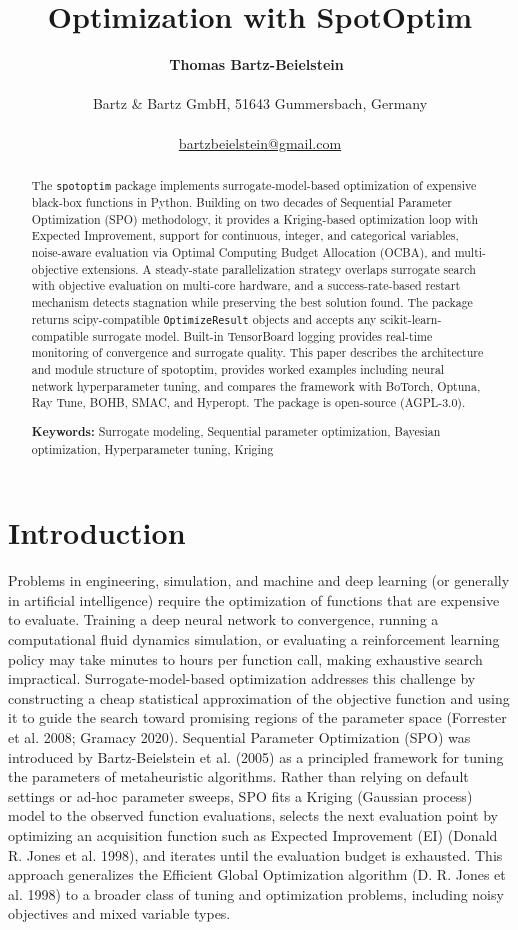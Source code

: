 \documentclass[
  twocolumn]{article}
\title{Optimization with SpotOptim}
\author{\textbf{Thomas
Bartz-Beielstein}~\orcidlink{0000-0002-5938-5158}\\\\Bartz \& Bartz
GmbH, 51643 Gummersbach,
Germany\\\\\href{mailto:bartzbeielstein@gmail.com}{bartzbeielstein@gmail.com}}
\date{}
\begin{document}
\maketitle
\begin{abstract}
The \texttt{spotoptim} package implements surrogate-model-based
optimization of expensive black-box functions in Python. Building on two
decades of Sequential Parameter Optimization (SPO) methodology, it
provides a Kriging-based optimization loop with Expected Improvement,
support for continuous, integer, and categorical variables, noise-aware
evaluation via Optimal Computing Budget Allocation (OCBA), and
multi-objective extensions. A steady-state parallelization strategy
overlaps surrogate search with objective evaluation on multi-core
hardware, and a success-rate-based restart mechanism detects stagnation
while preserving the best solution found. The package returns
scipy-compatible \texttt{OptimizeResult} objects and accepts any
scikit-learn-compatible surrogate model. Built-in TensorBoard logging
provides real-time monitoring of convergence and surrogate quality. This
paper describes the architecture and module structure of spotoptim,
provides worked examples including neural network hyperparameter tuning,
and compares the framework with BoTorch, Optuna, Ray Tune, BOHB, SMAC,
and Hyperopt. The package is open-source (AGPL-3.0).

\textbf{Keywords:} Surrogate modeling, Sequential parameter
optimization, Bayesian optimization, Hyperparameter tuning, Kriging
\end{abstract}


\section{Introduction}\label{sec-introduction}

Problems in engineering, simulation, and machine and deep learning (or
generally in artificial intelligence) require the optimization of
functions that are expensive to evaluate. Training a deep neural network
to convergence, running a computational fluid dynamics simulation, or
evaluating a reinforcement learning policy may take minutes to hours per
function call, making exhaustive search impractical.
Surrogate-model-based optimization addresses this challenge by
constructing a cheap statistical approximation of the objective function
and using it to guide the search toward promising regions of the
parameter space (Forrester et al. 2008; Gramacy 2020). Sequential
Parameter Optimization (SPO) was introduced by Bartz-Beielstein et al.
(2005) as a principled framework for tuning the parameters of
metaheuristic algorithms. Rather than relying on default settings or
ad-hoc parameter sweeps, SPO fits a Kriging (Gaussian process) model to
the observed function evaluations, selects the next evaluation point by
optimizing an acquisition function such as Expected Improvement (EI)
(Donald R. Jones et al. 1998), and iterates until the evaluation budget
is exhausted. This approach generalizes the Efficient Global
Optimization algorithm (D. R. Jones et al. 1998) to a broader class of
tuning and optimization problems, including noisy objectives and mixed
variable types.
\end{document}
